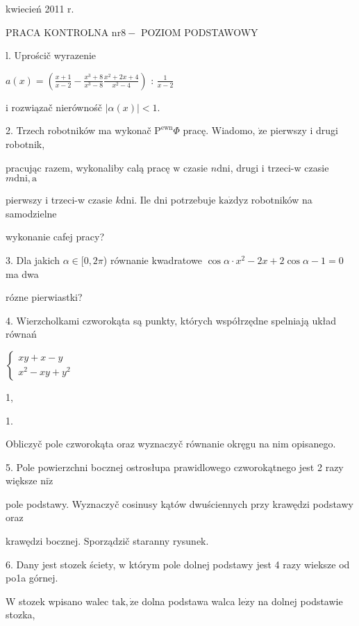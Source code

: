 \documentclass[a4paper,12pt]{article}
\begin{document}
kwiecień 2011 r.

PRACA KONTROLNA $\mathrm{n}\mathrm{r} 8-$ POZIOM PODSTAWOWY

l. Uprościč wyrazenie

$a(x)= (\displaystyle \frac{x+1}{x-2}-\frac{x^{3}+8}{x^{3}-8}\frac{x^{2}+2x+4}{x^{2}-4})$ : $\displaystyle \frac{1}{x-2}$

$\mathrm{i}$ rozwiązač nierównośč $|\alpha(x)|<1.$

2. Trzech robotników ma wykonač $\mathrm{P}^{\mathrm{e}\mathrm{w}\mathrm{n}}\Phi$ pracę. Wiadomo, $\dot{\mathrm{z}}\mathrm{e}$ pierwszy $\mathrm{i}$ drugi robotnik,

pracując razem, wykonaliby calą pracę $\mathrm{w}$ czasie $n\mathrm{d}\mathrm{n}\mathrm{i}$, drugi $\mathrm{i}$ trzeci-w czasie $m\mathrm{d}\mathrm{n}\mathrm{i}, \mathrm{a}$

pierwszy $\mathrm{i}$ trzeci-w czasie $k\mathrm{d}\mathrm{n}\mathrm{i}$. Ile dni potrzebuje $\mathrm{k}\mathrm{a}\dot{\mathrm{z}}\mathrm{d}\mathrm{y}\mathrm{z}$ robotników na samodzielne

wykonanie cafej pracy?

3. Dla jakich $\alpha\in [0,2\pi$) równanie kwadratowe $\cos\alpha\cdot x^{2}-2x+2\cos\alpha-1=0$ ma dwa

rózne pierwiastki?

4. Wierzcholkami czworokąta są punkty, których współrzędne spelniają układ równań

$\left\{\begin{array}{l}
xy+x-y\\
x^{2}-xy+y^{2}
\end{array}\right.$

1,

1.

Obliczyč pole czworokąta oraz wyznaczyč równanie okręgu na nim opisanego.

5. Pole powierzchni bocznej ostrosłupa prawidlowego czworokątnego jest 2 razy większe $\mathrm{n}\mathrm{i}\dot{\mathrm{z}}$

pole podstawy. Wyznaczyč cosinusy kątów dwuściennych przy krawędzi podstawy oraz

krawędzi bocznej. Sporządzič staranny rysunek.

6. Dany jest stozek ściety, $\mathrm{w}$ którym pole dolnej podstawy jest 4 razy wieksze od po1a górnej.

$\mathrm{W}$ stozek wpisano walec $\mathrm{t}\mathrm{a}\mathrm{k}, \dot{\mathrm{z}}\mathrm{e}$ dolna podstawa walca $\mathrm{l}\mathrm{e}\dot{\mathrm{z}}\mathrm{y}$ na dolnej podstawie stozka,
\end{document}
